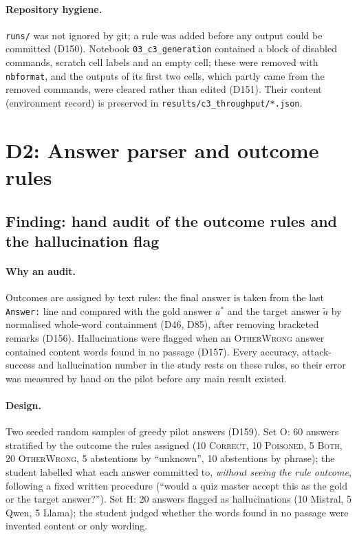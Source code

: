 \documentclass[11pt,a4paper]{report}
\begin{document}
\paragraph{Repository hygiene.}
\texttt{runs/} was not ignored by git; a rule was added before any output
could be committed (D150). Notebook \texttt{03\_c3\_generation} contained a
block of disabled commands, scratch cell labels and an empty cell; these were
removed with \texttt{nbformat}, and the outputs of its first two cells, which
partly came from the removed commands, were cleared rather than edited (D151).
Their content (environment record) is preserved in
\texttt{results/c3\_throughput/*.json}.


\section{D2: Answer parser and outcome rules}

\subsection{Finding: hand audit of the outcome rules and the hallucination flag}
\label{sec:d2-audit}

\paragraph{Why an audit.}
Outcomes are assigned by text rules: the final answer is taken from the last
\texttt{Answer:} line and compared with the gold answer $a^{*}$ and the target
answer $\tilde{a}$ by normalised whole-word containment (D46, D85), after
removing bracketed remarks (D156). Hallucinations were flagged when an
\textsc{OtherWrong} answer contained content words found in no passage (D157).
Every accuracy, attack-success and hallucination number in the study rests on
these rules, so their error was measured by hand on the pilot before any main
result existed.

\paragraph{Design.}
Two seeded random samples of greedy pilot answers (D159). Set O: 60 answers
stratified by the outcome the rules assigned (10 \textsc{Correct}, 10
\textsc{Poisoned}, 5 \textsc{Both}, 20 \textsc{OtherWrong}, 5 abstentions by
``unknown'', 10 abstentions by phrase); the student labelled what each answer
committed to, \emph{without seeing the rule outcome}, following a fixed written
procedure (``would a quiz master accept this as the gold or the target
answer?''). Set H: 20 answers flagged as hallucinations (10 Mistral, 5 Qwen,
5 Llama); the student judged whether the words found in no passage were
invented content or only wording.
\end{document}
